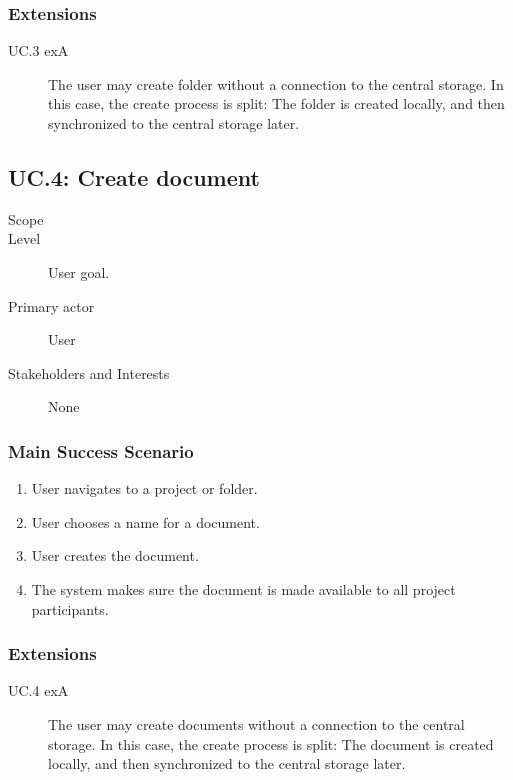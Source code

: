 \subsubsection{Extensions}
\begin{description}
    \item[UC.3 exA] The user may create folder without a connection to the central storage.
        In this case, the create process is split: The folder is created locally, and then synchronized
        to the central storage later.
\end{description}

\subsection{UC.4: Create document}
\begin{description}
    \item[Scope] \SOP{}
    \item[Level] User goal.
    \item[Primary actor] User
    \item[Stakeholders and Interests] None
\end{description}
    
\subsubsection{Main Success Scenario}
\begin{enumerate}
    \item User navigates to a project or folder.
    \item User chooses a name for a document.
    \item User creates the document.
    \item The system makes sure the document is made available to all project participants.
\end{enumerate}
    
\subsubsection{Extensions}
\begin{description}
    \item[UC.4 exA] The user may create documents without a connection to the central storage.
        In this case, the create process is split: The document is created locally, and then
        synchronized to the central storage later.
\end{description}

